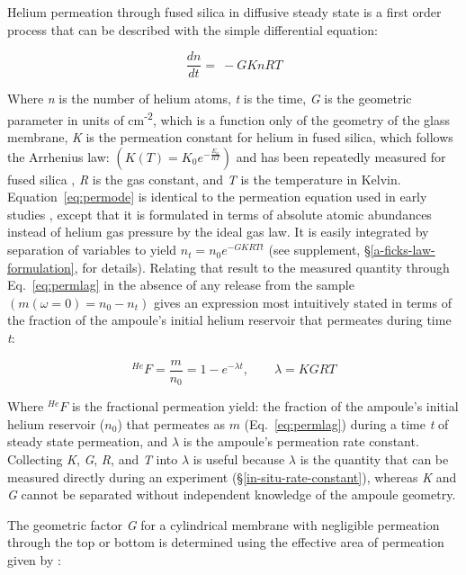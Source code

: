 Helium permeation through fused silica in diffusive steady state is a first order process that can be described with the simple differential equation:

\begin{equation}
\label{eq:permode}
\frac{dn}{dt} = \  - GKnRT
\end{equation}

Where \emph{n} is the number of helium atoms, \emph{t} is the time, \emph{G} is the geometric parameter in units of cm\textsuperscript{-2}, which is a function only of the geometry of the glass membrane, \emph{K} is the permeation constant for helium in fused silica, which follows the Arrhenius law: \(\left( K(T) = K_{0}e^{- \frac{E_{a}}{RT}} \right)\) and has been repeatedly measured for fused silica \citep{norton1953,altemose1961,swets1961,masaryk1968}, \emph{R} is the gas constant, and \emph{T} is the temperature in Kelvin. Equation~\eqref{eq:permode} is identical to the permeation equation used in early studies \citep{norton1953,altemose1961,swets1961,studt1962,masaryk1968}, except that it is formulated in terms of absolute atomic abundances instead of helium gas pressure by the ideal gas law. It is easily integrated by separation of variables to yield \(n_{t} = n_{0}e^{- GKRTt}\) (see supplement, \S\ref{a-ficks-law-formulation}, for details). Relating that result to the measured quantity through Eq.~\eqref{eq:permlag} in the absence of any release from the sample \(\left( m(\omega = 0) = n_{0} - n_{t} \right)\) gives an expression most intuitively stated in terms of the fraction of the ampoule's initial helium reservoir that permeates during time \emph{t}:

\begin{equation}
\label{eq:permsol}
^{He}F = \frac{m}{n_{0}} = 1 - e^{- \lambda t}, \qquad \lambda = KGRT
\end{equation}

Where \(^{He}F\) is the fractional permeation yield: the fraction of the ampoule's initial helium reservoir (\(n_{0}\)) that permeates as \(m\) (Eq.~\eqref{eq:permlag}) during a time \emph{t} of steady state permeation, and \(\lambda\) is the ampoule's permeation rate constant. Collecting \emph{K}, \emph{G}, \emph{R}, and \emph{T} into \(\lambda\) is useful because \(\lambda\) is the quantity that can be measured directly during an experiment (\S\ref{in-situ-rate-constant}), whereas \emph{K} and \emph{G} cannot be separated without independent knowledge of the ampoule geometry.

The geometric factor \emph{G} for a cylindrical membrane with negligible permeation through the top or bottom is determined using the effective area of permeation given by \citet{masaryk1968}:

